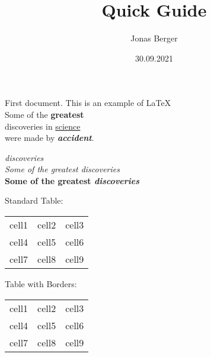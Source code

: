 \documentclass[12pt, letterpaper]{article}
\title{Quick Guide}
\author{Jonas Berger}
\date{30.09.2021}
\begin{document}
\maketitle

First document. This is an example of \LaTeX{} 
\\
Some of the \textbf{greatest}
\\
discoveries in \underline{science}
\\
were made by \textbf{\textit{accident}}.

\emph{discoveries}
\\
\textit{Some of the greatest \emph{discoveries}}
\\
\textbf{Some of the greatest \emph{discoveries}}


Standard Table:
\begin{center}
\begin{tabular}{c c c} %
	cell1&cell2&cell3\\
	cell4&cell5&cell6\\
	cell7&cell8&cell9
\end{tabular}
\end{center}

Table with Borders:
\begin{center}
\begin{tabular}{ |c|c|c| } %
	\hline
	cell1&cell2&cell3\\
	cell4&cell5&cell6\\
	cell7&cell8&cell9\\
	\hline
\end{tabular}
\end{center}
\end{document}
